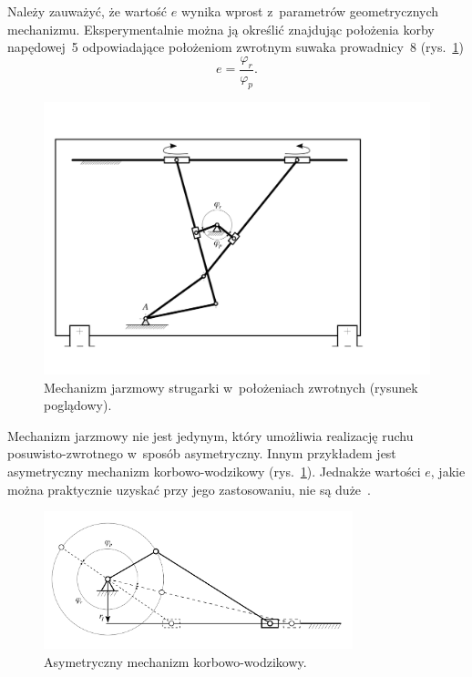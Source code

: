 \documentclass[paper=a4,DIV=12]{tmmlab}
\begin{document}
Należy zauważyć, że wartość $e$ wynika wprost z~parametrów geometrycznych
mechanizmu. Eksperymentalnie można ją określić znajdując położenia korby
napędowej~5 odpowiadające położeniom zwrotnym suwaka prowadnicy~8
(rys.~\ref{fig:CMH6U})
\begin{equation}
  e = \frac{\varphi_r}{\varphi_p}.
  \label{eq:LWY0U}
\end{equation}
\begin{figure}[htbp]
  \centering
  \includegraphics[height=0.4\textheight]{lab11/strugarka-zwrotniki}
  \caption{Mechanizm jarzmowy strugarki w~położeniach zwrotnych (rysunek
           poglądowy).}
  \label{fig:CMH6U}
\end{figure}

Mechanizm jarzmowy nie jest jedynym, który umożliwia realizację ruchu
posuwisto-zwrotnego w~sposób asymetryczny. Innym przykładem jest asymetryczny
mechanizm korbowo-wodzikowy (rys.~\ref{fig:CMH6U}). Jednakże wartości $e$,
jakie można praktycznie uzyskać przy jego zastosowaniu, nie są
duże~\cite{oledzki:1987:podstawy}.
\begin{figure}[htbp]
  \centering
  \includegraphics[width=0.8\textwidth]{lab11/korbowodzik-asymetryczny}
  \caption{Asymetryczny mechanizm korbowo-wodzikowy.}
  \label{fig:Z8R5Q}
\end{figure}
\end{document}

